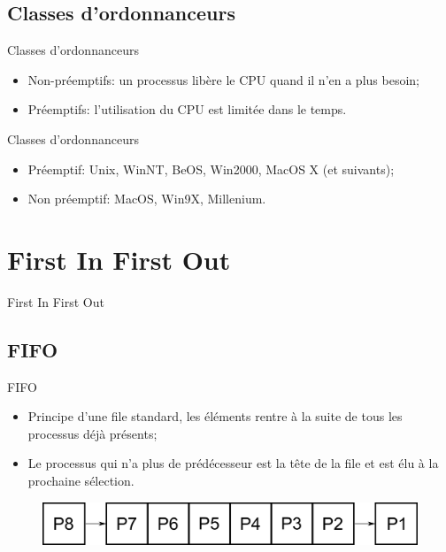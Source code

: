 \begin{frame}{\sectitle}

\def\subsectitle{Classes d'ordonnanceurs}
\subsection{\subsectitle}

\begin{block}{\subsectitle}
\begin{itemize}
    \item Non-préemptifs: un processus libère le CPU quand il n'en a plus
    besoin;
    \item Préemptifs: l'utilisation du CPU est limitée dans le temps.
\end{itemize}
\end{block}

\begin{exampleblock}{\subsectitle}
\begin{itemize}
    \item Préemptif: Unix, WinNT, BeOS, Win2000, MacOS X (et suivants);
        \item Non préemptif: MacOS, Win9X, Millenium.
\end{itemize}
\end{exampleblock}

\end{frame}

\def\sectitle{First In First Out}
\section{\sectitle}

\begin{frame}{\sectitle}

\def\subsectitle{FIFO}
\subsection{\subsectitle}

\begin{block}{\subsectitle}
\begin{itemize}
    \item Principe d'une file standard, les éléments rentre à la suite de tous
    les processus déjà présents;
    \item Le processus qui n'a plus de prédécesseur est la tête de la file et
    est élu à la prochaine sélection.
\end{itemize}
\end{block}


\begin{figure}
\includegraphics[width=\textwidth]{images/FIFO.pdf}
\end{figure}

\end{frame}


